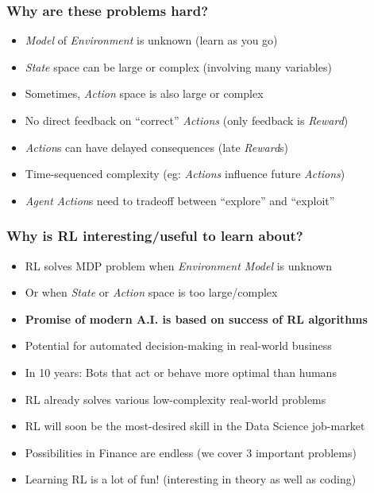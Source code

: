 \documentclass{beamer}
\begin{document}
\begin{frame}
\frametitle{Why are these problems hard?}
\begin{itemize}
\item {\em Model} of {\em Environment} is unknown (learn as you go)
\item {\em State} space can be large or complex (involving many variables)
\item Sometimes, {\em Action} space is also large or complex
\item No direct feedback on ``correct'' {\em Actions} (only feedback is {\em Reward})
\item {\em Action}s can have delayed consequences (late {\em Reward}s)
\item Time-sequenced complexity (eg: {\em Actions} influence future {\em Actions})
\item {\em Agent} {\em Action}s need to tradeoff between ``explore'' and ``exploit''
\end{itemize}
\end{frame}

\begin{frame}
\frametitle{Why is RL interesting/useful to learn about?}
\begin{itemize}
\item RL solves MDP problem when {\em Environment Model} is unknown
\item Or when {\em State} or {\em Action} space is too large/complex
\item {\bf Promise of modern A.I. is based on success of RL algorithms}
\item Potential for automated decision-making in real-world business
\item In 10 years: Bots that act or behave more optimal than humans
\item RL already solves various low-complexity real-world problems
\item RL will soon be the most-desired skill in the Data Science job-market
\item Possibilities in Finance are endless (we cover 3 important problems)
\item Learning RL is a lot of fun! (interesting in theory as well as coding)
\end{itemize}
\end{frame}
\end{document}
